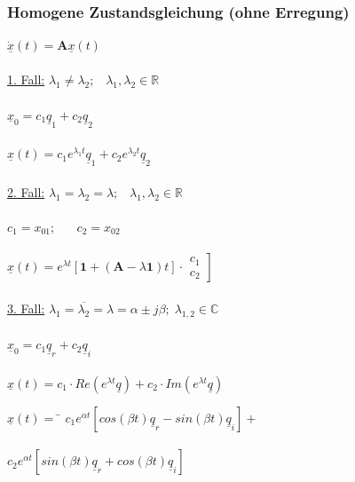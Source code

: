 \documentclass[a4paper,twocolumn,10pt]{article}
\begin{document}
\subsubsection*{Homogene Zustandsgleichung (ohne Erregung)}
$\dot {\underline{x}}(t)=\textbf{A}\underline{x}(t)$\\\\
\underline{1. Fall:} $\lambda_1 \ne \lambda_2;\;\;\;\lambda_1,\lambda_2\in \mathbb{R}$\\\\
$\underline{x}_0=c_1\underline{q}_1+c_2\underline{q}_2$\\\\
$\underline{x}(t)=c_1e^{\lambda_1t}\underline{q}_1+c_2e^{\lambda_2t}\underline{q}_2$\\\\
\underline{2. Fall:} $\lambda_1 = \lambda_2=\lambda;\;\;\;\lambda_1,\lambda_2\in \mathbb{R}$\\\\
$c_1=x_{01};\;\;\;\;\;\;c_2=x_{02}$\\\\
$\underline{x}(t)=e^{\lambda t}[\textbf{1}+(\textbf{A}-\lambda \textbf{1})t]\cdot\left.\begin{matrix}c_1 \\ c_2\end{matrix}\right]$\\\\
\underline{3. Fall:} $\lambda_1=\overline{\lambda_2}=\lambda =\alpha \pm j\beta;\;\lambda_{1,2}\in \mathbb{C}$\\\\
$\underline{x}_0=c_1\underline{q}_r+c_2\underline{q}_i$\\\\
$\underline{x}(t)=c_1\cdot Re(e^{\lambda t}\underline{q})+c_2\cdot Im(e^{\lambda t}\underline{q})$\\
\begin{tabbing}
$\underline{x}(t)=$ \= $c_1e^{\alpha t}[cos(\beta t)\underline{q}_r-sin(\beta t)\underline{q}_i]+$\\\\
\> $c_2e^{\alpha t}[sin(\beta t)\underline{q}_r+cos(\beta t)\underline{q}_i]$
\end{tabbing}
\end{document}
